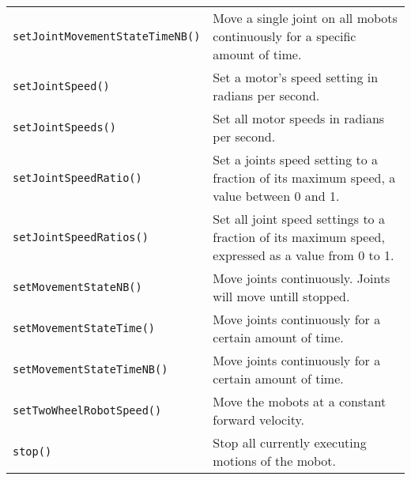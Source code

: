 \begin{tabular}{p{1.75in}p{4.5in}}
\texttt{setJointMovementStateTimeNB()} & Move a single joint on all mobots continuously for a specific amount of time. \\
\texttt{setJointSpeed()} & Set a motor's speed setting in radians per second. \\
\texttt{setJointSpeeds()} & Set all motor speeds in radians per second. \\
\texttt{setJointSpeedRatio()} & Set a joints speed setting to a fraction of its maximum speed, a value between 0 and 1. \\
\texttt{setJointSpeedRatios()} & Set all joint speed settings to a fraction of its
maximum speed, expressed as a value from 0 to 1. \\
\texttt{setMovementStateNB()} & Move joints continuously. Joints will move untill stopped.\\
\texttt{setMovementStateTime()} & Move joints continuously for a certain amount of time.\\
\texttt{setMovementStateTimeNB()} & Move joints continuously for a certain amount of time.\\
\texttt{setTwoWheelRobotSpeed()} & Move the mobots at a constant forward velocity. \\
\texttt{stop()} & Stop all currently executing motions of the mobot. \\
\hline
\end{tabular}

